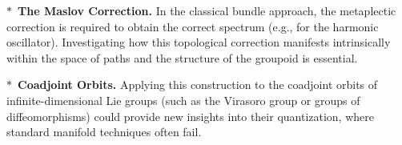 \begin{article}
    $\ast$~\textbf{The Maslov Correction.}
    In the classical bundle approach,
    the metaplectic correction is required to obtain the correct spectrum (e.g., for the harmonic oscillator).
    Investigating how this topological correction manifests intrinsically within the space of paths and the structure of the groupoid is essential.
    
    $\ast$~\textbf{Coadjoint Orbits.}
    Applying this construction to the coadjoint orbits of infinite-dimensional Lie groups (such as the Virasoro group or groups of diffeomorphisms) could provide new insights into their quantization,
    where standard manifold techniques often fail.
    
  \end{article}
  
  
